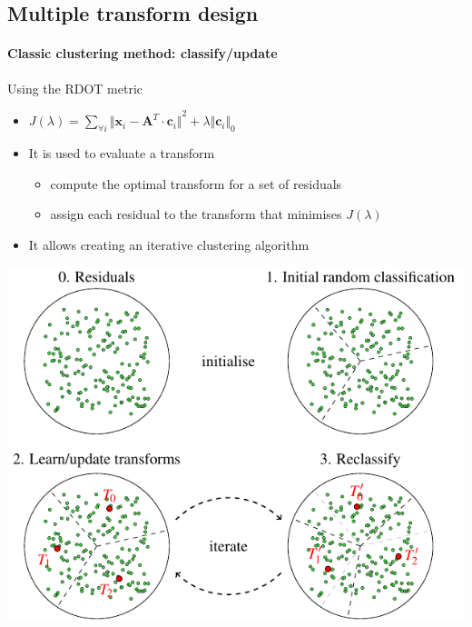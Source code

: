 \documentclass[10pt]{beamer} %
\makeatletter
\newcommand*{\currentname}{\@currentlabelname}
\def\x{\mathbf{x}}
\def\c{\mathbf{c}}
\def\A{\mathbf{A}}
\makeatother
\begin{document}
\subsection{Multiple transform design}
\begin{frame}{\currentname}
	\framesubtitle{Classic clustering method: classify/update}
	\begin{minipage}{0.49\textwidth}
		\small
		\begin{block}{Using the RDOT metric}
			\begin{itemize}
				\item $J(\lambda)=\displaystyle\sum_{\forall i}
					{\Vert\x_i-\A^T\cdot \c_i\Vert}^2
					+\lambda {\Vert\c_i\Vert}_0$
				\item It is used to evaluate a transform
					\begin{itemize}
						\scriptsize
						\item compute the optimal transform for a set of
							residuals
						\item assign each residual to the transform that
							minimises $J(\lambda)$
					\end{itemize}
				\item It allows creating an iterative clustering algorithm
			\end{itemize}
		\end{block}
	\end{minipage}
	\hfill
	\begin{minipage}{0.49\textwidth}
		\includegraphics[width=\textwidth]{./figures/clustering.pdf}
	\end{minipage}
\end{frame}
\end{document}
